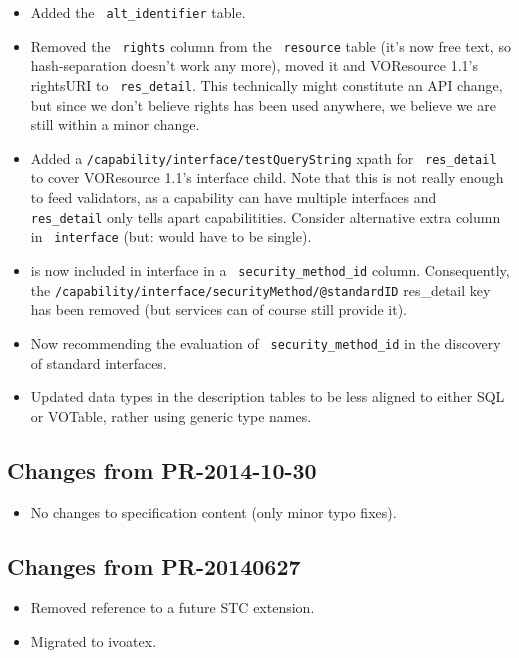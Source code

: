 \documentclass[11pt,a4paper]{ivoa}
\newcommand{\rtent}[1]{\texttt{\color{rtcolor} #1}}
\begin{document}
\begin{itemize}
\item Added the \rtent{alt\_identifier} table.
\item Removed the \rtent{rights} column from the \rtent{resource} table
(it's now free text, so hash-separation doesn't work any more),
moved it and VOResource 1.1's rightsURI to \rtent{res\_detail}.  This
technically might constitute an API change, but since we don't believe
rights has been used anywhere, we believe we are still within a minor
change.
\item Added a \texttt{/capability/interface/testQueryString} xpath for
\rtent{res\_detail} to cover VOResource 1.1's 
interface child.  Note that this is not really enough to feed
validators, as a capability can have multiple interfaces and
\rtent{res\_detail} only tells apart capabilitities.  Consider
alternative extra column in \rtent{interface} (but:
 would have to be single).
\item {} is now included in interface
in a \rtent{security\_method\_id} column.  Consequently, the 
\texttt{/capability/inter\-face/securityMethod/@standardID} res\_detail
key has been removed (but services can of course still provide it).
\item Now recommending the evaluation of \rtent{security\_method\_id} in
the discovery of standard interfaces.
\item Updated data types in the description tables to be less aligned to
either SQL or VOTable, rather using generic type names.
\end{itemize}

\subsection{Changes from PR-2014-10-30}

\begin{itemize}
\item No changes to specification content (only minor typo fixes).
\end{itemize}


\subsection{Changes from PR-20140627}

\begin{itemize}
\item Removed reference to a future STC extension.
\item Migrated to ivoatex.
\end{itemize}
\end{document}

